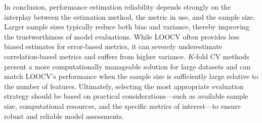 In conclusion, performance estimation reliability depends strongly on the interplay between the estimation method, the metric in use, and the sample size. Larger sample sizes typically reduce both bias and variance, thereby improving the trustworthiness of model evaluations. While LOOCV often provides less biased estimates for error-based metrics, it can severely underestimate correlation-based metrics and suffers from higher variance. $K$-fold CV methods present a more computationally manageable solution for large datasets and can match LOOCV’s performance when the sample size is sufficiently large relative to the number of features. Ultimately, selecting the most appropriate evaluation strategy should be based on practical considerations—such as available sample size, computational resources, and the specific metrics of interest—to ensure robust and reliable model assessments.


